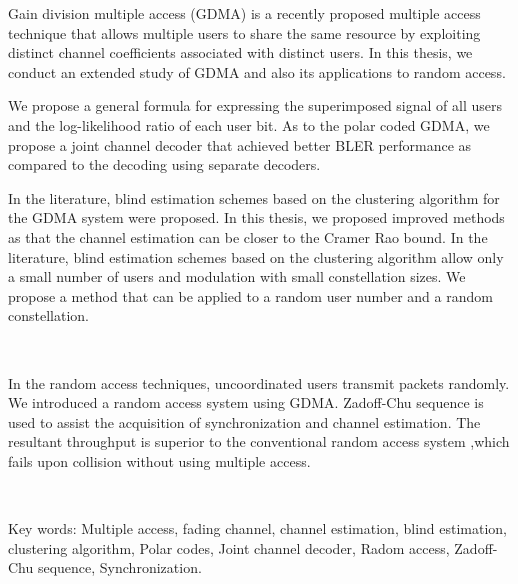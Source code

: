 \begin{abstractEN}

Gain division multiple access (GDMA) is a recently proposed multiple access technique that allows multiple users to share the same resource by exploiting distinct channel coefficients associated with distinct users. In this thesis, we conduct an extended study of GDMA and also its applications to random access.

We propose a general formula for expressing the superimposed signal of all users and the log-likelihood ratio of each user bit.  As to the polar coded GDMA, we propose a joint channel decoder that achieved better BLER performance as compared to the decoding using separate decoders.

In the literature, blind estimation schemes based on the clustering algorithm for the GDMA system were proposed.  In this thesis, we proposed improved methods as that the channel estimation can be closer to the Cramer Rao bound.   In the literature, blind estimation schemes based on the clustering algorithm allow only a small number of users and modulation with small constellation sizes.  We propose a method that can be applied to a random user number and a random constellation. 

\

In the random access techniques, uncoordinated users transmit packets randomly. We introduced a random access system using GDMA.  Zadoff-Chu sequence is used to assist the acquisition of synchronization and channel estimation. The resultant throughput is superior to the conventional random access system ,which fails upon collision without using multiple access.  


\

Key words: Multiple access, fading channel, channel estimation, blind estimation, clustering algorithm, Polar codes, Joint channel  decoder, Radom access, Zadoff-Chu sequence, Synchronization.

\end{abstractEN}
